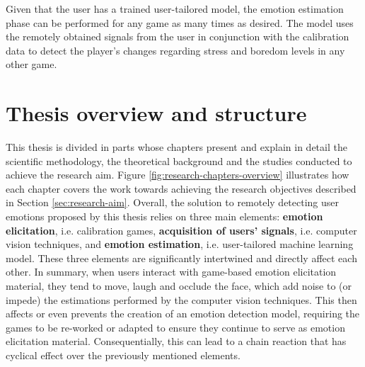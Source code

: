 Given that the user has a trained user-tailored model, the emotion estimation phase can be performed for any game as many times as desired. The model uses the remotely obtained signals from the user in conjunction with the calibration data to detect the player's changes regarding stress and boredom levels in any other game.


\section{Thesis overview and structure}

This thesis is divided in parts whose chapters present and explain in detail the scientific methodology, the theoretical background and the studies conducted to achieve the research aim. Figure \ref{fig:research-chapters-overview} illustrates how each chapter covers the work towards achieving the research objectives described in Section \ref{sec:research-aim}. Overall, the solution to remotely detecting user emotions proposed by this thesis relies on three main elements: \textbf{emotion elicitation}, i.e. calibration games, \textbf{acquisition of users' signals}, i.e. computer vision techniques, and \textbf{emotion estimation}, i.e. user-tailored machine learning model. These three elements are significantly intertwined and directly affect each other. In summary, when users interact with game-based emotion elicitation material, they tend to move, laugh and occlude the face, which add noise to (or impede) the estimations performed by the computer vision techniques. This then affects or even prevents the creation of an emotion detection model, requiring the games to be re-worked or adapted to ensure they continue to serve as emotion elicitation material. Consequentially, this can lead to a chain reaction that has cyclical effect over the previously mentioned elements.

